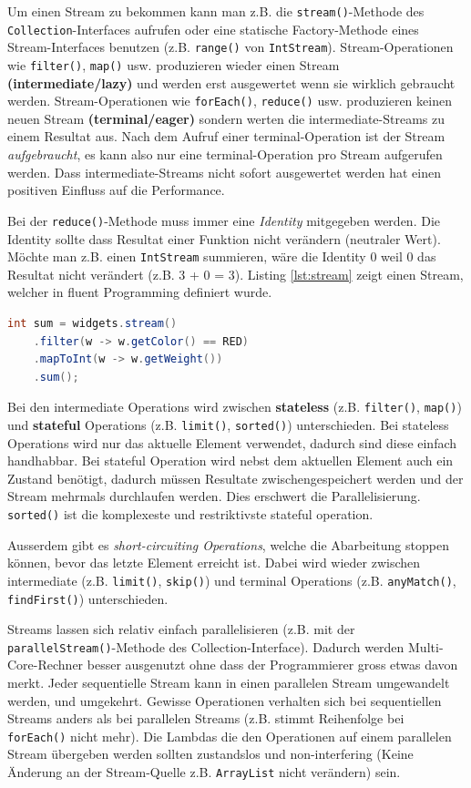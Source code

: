 Um einen Stream zu bekommen kann man z.B. die \verb|stream()|-Methode des \verb|Collection|-Interfaces aufrufen oder eine statische Factory-Methode eines Stream-Interfaces benutzen (z.B. \verb|range()| von \verb|IntStream|). Stream-Operationen wie \verb|filter()|, \verb|map()| usw. produzieren wieder einen Stream \textbf{(intermediate/lazy)} und werden erst ausgewertet wenn sie wirklich gebraucht werden. Stream-Operationen wie \verb|forEach()|, \verb|reduce()| usw. produzieren keinen neuen Stream \textbf{(terminal/eager)} sondern werten die intermediate-Streams zu einem Resultat aus. Nach dem Aufruf einer terminal-Operation ist der Stream \textit{aufgebraucht}, es kann also nur eine terminal-Operation pro Stream aufgerufen werden. Dass intermediate-Streams nicht sofort ausgewertet werden hat einen positiven Einfluss auf die Performance. 

Bei der \verb|reduce()|-Methode muss immer eine \textit{Identity} mitgegeben werden. Die Identity sollte dass Resultat einer Funktion nicht verändern (neutraler Wert). Möchte man z.B. einen \verb|IntStream| summieren, wäre die Identity 0 weil 0 das Resultat nicht verändert (z.B. 3 + 0 = 3). Listing \ref{lst:stream} zeigt einen Stream, welcher in fluent Programming definiert wurde.

\begin{lstlisting}[language=Java, caption=Stream, label=lst:stream]
int sum = widgets.stream()
	.filter(w -> w.getColor() == RED)
	.mapToInt(w -> w.getWeight())
	.sum();
\end{lstlisting}

Bei den intermediate Operations wird zwischen \textbf{stateless} (z.B. \verb|filter()|, \verb|map()|) und \textbf{stateful} Operations (z.B. \verb|limit()|, \verb|sorted()|) unterschieden. Bei stateless Operations wird nur das aktuelle Element verwendet, dadurch sind diese einfach handhabbar. Bei stateful Operation wird nebst dem aktuellen Element auch ein Zustand benötigt, dadurch müssen Resultate zwischengespeichert werden und der Stream mehrmals durchlaufen werden. Dies erschwert die Parallelisierung. \verb|sorted()| ist die komplexeste und restriktivste stateful operation. 

Ausserdem gibt es \textit{short-circuiting Operations}, welche die Abarbeitung stoppen können, bevor das letzte Element erreicht ist. Dabei wird wieder zwischen intermediate (z.B. \verb|limit()|, \verb|skip()|) und terminal Operations (z.B. \verb|anyMatch()|, \verb|findFirst()|) unterschieden.

Streams lassen sich relativ einfach parallelisieren (z.B. mit der \verb|parallelStream()|-Methode des Collection-Interface). Dadurch werden Multi-Core-Rechner besser ausgenutzt ohne dass der Programmierer gross etwas davon merkt. Jeder sequentielle Stream kann in einen parallelen Stream umgewandelt werden, und umgekehrt. Gewisse Operationen verhalten sich bei sequentiellen Streams anders als bei parallelen Streams (z.B. stimmt Reihenfolge bei \verb|forEach()| nicht mehr). Die Lambdas die den Operationen auf einem parallelen Stream übergeben werden sollten zustandslos und non-interfering (Keine Änderung an der Stream-Quelle z.B. \verb|ArrayList| nicht verändern) sein.

